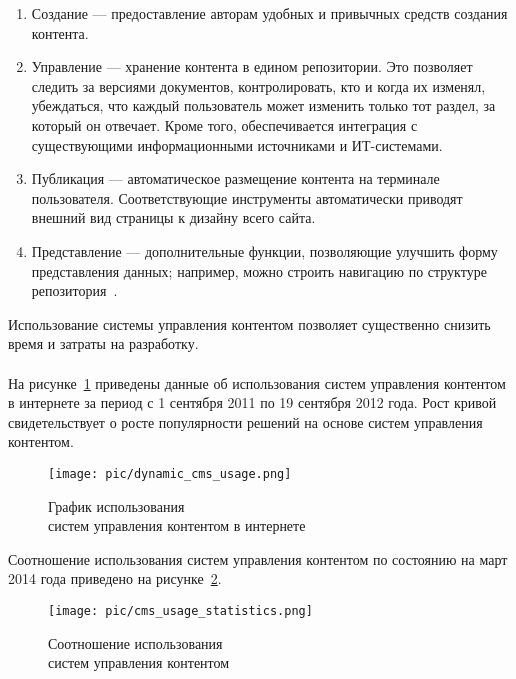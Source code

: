 \begin{enumerate}
\item
  Создание --- предоставление авторам удобных и привычных средств создания контента.

\item
  Управление --- хранение контента в едином репозитории. 
  Это позволяет следить за версиями документов, контролировать, кто и когда их изменял, убеждаться,
  что каждый пользователь может изменить только тот раздел, за который он отвечает.
  Кроме того, обеспечивается интеграция с существующими информационными источниками и ИТ-системами.

\item
  Публикация --- автоматическое размещение контента на терминале пользователя. 
  Соответствующие инструменты автоматически приводят внешний вид страницы к дизайну всего сайта.

\item
  Представление --- дополнительные функции, позволяющие улучшить форму представления данных; например,
  можно строить навигацию по структуре репозитория~\cite{osp_cms_functions}.
\end{enumerate}

Использование системы управления контентом позволяет существенно снизить время и затраты на разработку.

\paragraph{}
На рисунке~\ref{fig:cms_usage_dynamic} приведены данные об использования систем управления контентом в интернете за период
с 1 сентября 2011 по 19 сентября 2012 года. Рост кривой свидетельствует о росте популярности решений на 
основе систем управления контентом.

\begin{figure}[h]
  \centering
  \texttt{[image: pic/dynamic\_cms\_usage.png]}
  \caption{График использования \\ систем управления контентом в интернете}
  \label{fig:cms_usage_dynamic}
\end{figure}

Соотношение использования систем управления контентом по состоянию на март 2014 года приведено
на рисунке~\ref{fig:cms_usage_stat}.

\begin{figure}[h]
  \centering
  \texttt{[image: pic/cms\_usage\_statistics.png]}
  \caption{Соотношение использования \\ систем управления контентом}
  \label{fig:cms_usage_stat}
\end{figure}

